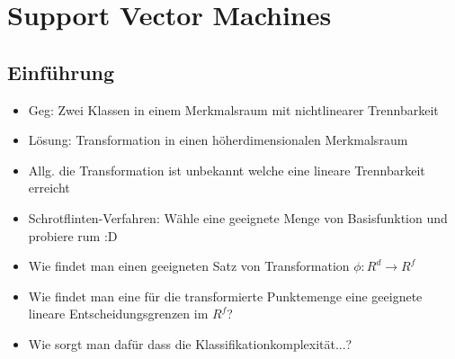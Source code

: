\documentclass{article} %
\begin{document}
\section{Support Vector Machines}
	\subsection{Einführung}
	\begin{itemize}
		\item Geg: Zwei Klassen in einem Merkmalsraum mit nichtlinearer Trennbarkeit
		\item Lösung: Transformation in einen höherdimensionalen Merkmalsraum
		\item Allg. die Transformation ist unbekannt welche eine lineare Trennbarkeit erreicht
		\item Schrotflinten-Verfahren: Wähle eine geeignete Menge von Basisfunktion und probiere rum :D
		\item Wie findet man einen geeigneten Satz von Transformation $\phi: R^d \rightarrow R^f$
		\item Wie findet man eine für die transformierte Punktemenge eine geeignete lineare Entscheidungsgrenzen im $R^f$?
		\item Wie sorgt man dafür dass die Klassifikationkomplexität...?
	\end{itemize}
\end{document}
